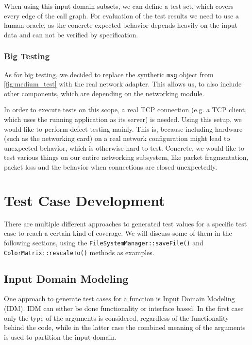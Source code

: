 \documentclass{scrreprt}
\begin{document}
When using this input domain subsets, we can define a test set, which covers every edge of the call graph. For evaluation of the test results we need to use a human oracle, as the concrete expected behavior depends heavily on the input data and can not be verified by specification.

\subsubsection{Big Testing}

As for big testing, we decided to replace the synthetic \texttt{msg} object from \vref{fig:medium_test} with the real network adapter. This allows us, to also include other components, which are depending on the networking module.

In order to execute tests on this scope, a real TCP connection (e.g. a TCP client, which uses the running application as its server) is needed. Using this setup, we would like to perform defect testing mainly. This is, because including hardware (such as the networking card) on a real network configuration might lead to unexpected behavior, which is otherwise hard to test. Concrete, we would like to test various things on our entire networking subsystem, like packet fragmentation, packet loss and the behavior when connections are closed unexpectedly. %

\section{Test Case Development}

There are multiple different approaches to generated test values for a specific test case to reach a certain kind of coverage. We will discuss some of them in the following sections, using the \texttt{FileSystemManager::saveFile()} and  \texttt{ColorMatrix::rescaleTo()} methods as examples.

\subsection{Input Domain Modeling}

One approach to generate test cases for a function is Input Domain Modeling (IDM). IDM can either be done functionality or interface based. In the first case only the type of the arguments is considered, regardless of the functionality behind the code, while in the latter case the combined meaning of the arguments is used to partition the input domain.
\end{document}
